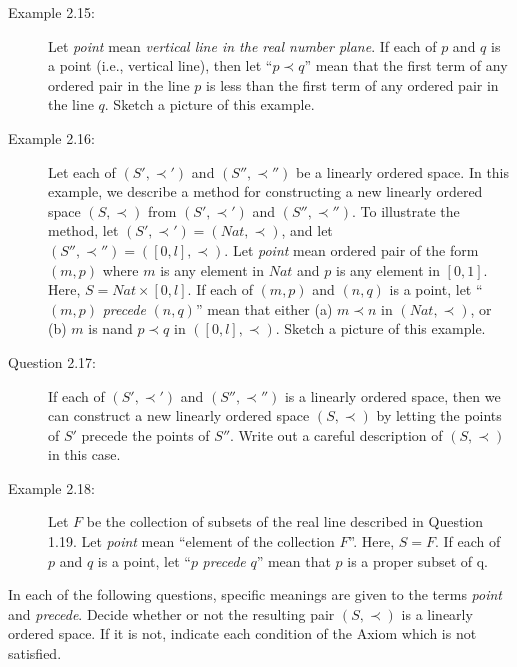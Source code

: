 \documentclass{book}
\begin{document}
\begin{description}
\item[Example 2.15:] Let \emph{point} mean \emph{vertical line in the real number plane}. If each of $p$ and $q$ is a point (i.e., vertical line), then let ``$p \prec q$'' mean that the first term of any ordered pair in the line $p$ is less than the first term of any ordered pair in the line $q$. Sketch a picture of this example.

\item[Example 2.16:] Let each of $(S', \prec ')$ and $(S'', \prec '')$ be a linearly ordered space. In this example, we describe a method for constructing a new linearly ordered space $(S, \prec)$ from $(S', \prec ')$ and $(S'', \prec '')$. To illustrate the method, let $(S', \prec ') = (Nat, \prec)$, and let $(S'', \prec '') = ([0,l], \prec)$. Let \emph{point} mean ordered pair of the form $(m,p)$ where $m$ is any element in $Nat$ and $p$ is any element in $[0,1]$. Here, $S = Nat \times [0,l]$. If each of $(m,p)$ and $(n,q)$ is a point, let ``$(m,p)$ \emph{precede} $(n,q)$'' mean that either (a) $m \prec n$ in $(Nat,\prec)$, or (b) $m$ is nand $p \prec q$ in $([0,l],\prec)$. Sketch a picture of this example.

\item[Question 2.17:] If each of $(S', \prec ')$ and $(S'', \prec '')$ is a linearly ordered space, then we can construct a new linearly ordered space $(S, \prec)$ by letting the points of $S'$ precede the points of $S''$. Write out a careful description of $(S, \prec)$ in this case.

\item[Example 2.18:] Let $F$ be the collection of subsets of the real line described in Question 1.19. Let \emph{point} mean ``element of the collection $F$''. Here, $S = F$. If each of $p$ and $q$ is a point, let ``$p$ \emph{precede} $q$'' mean that $p$ is a proper subset of q.

\end{description}

In each of the following questions, specific meanings are given to the terms \emph{point} and \emph{precede}. Decide whether or not the resulting pair $(S, \prec)$ is a linearly ordered space. If it is not, indicate each condition of the Axiom which is not satisfied.
\end{document}
